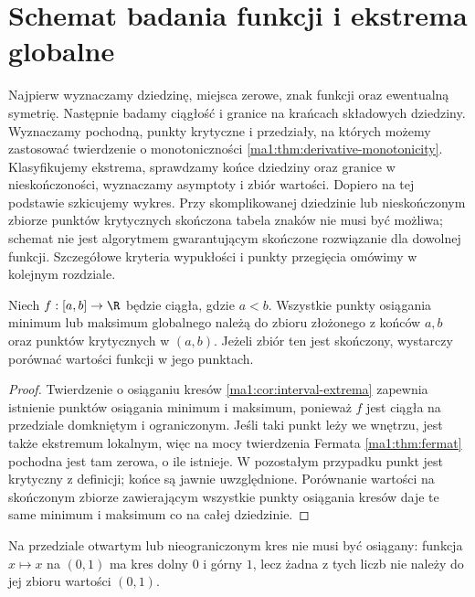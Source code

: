 \section{Schemat badania funkcji i ekstrema globalne}
Najpierw wyznaczamy dziedzinę, miejsca zerowe, znak funkcji oraz ewentualną symetrię. Następnie badamy ciągłość i granice na krańcach składowych dziedziny. Wyznaczamy pochodną, punkty krytyczne i przedziały, na których możemy zastosować twierdzenie o monotoniczności \ref{ma1:thm:derivative-monotonicity}. Klasyfikujemy ekstrema, sprawdzamy końce dziedziny oraz granice w nieskończoności, wyznaczamy asymptoty i zbiór wartości. Dopiero na tej podstawie szkicujemy wykres. Przy skomplikowanej dziedzinie lub nieskończonym zbiorze punktów krytycznych skończona tabela znaków nie musi być możliwa; schemat nie jest algorytmem gwarantującym skończone rozwiązanie dla dowolnej funkcji. Szczegółowe kryteria wypukłości i punkty przegięcia omówimy w kolejnym rozdziale.

\begin{stwierdzenie}
\label{ma1:prop:global-extrema-candidates}
Niech $f:[a,b]\to\R$ będzie ciągła, gdzie $a<b$. Wszystkie punkty osiągania minimum lub maksimum globalnego należą do zbioru złożonego z końców $a,b$ oraz punktów krytycznych w $(a,b)$. Jeżeli zbiór ten jest skończony, wystarczy porównać wartości funkcji w jego punktach.
\end{stwierdzenie}
\begin{proof}
Twierdzenie o osiąganiu kresów \ref{ma1:cor:interval-extrema} zapewnia istnienie punktów osiągania minimum i maksimum, ponieważ $f$ jest ciągła na przedziale domkniętym i ograniczonym. Jeśli taki punkt leży we wnętrzu, jest także ekstremum lokalnym, więc na mocy twierdzenia Fermata \ref{ma1:thm:fermat} pochodna jest tam zerowa, o ile istnieje. W pozostałym przypadku punkt jest krytyczny z definicji; końce są jawnie uwzględnione. Porównanie wartości na skończonym zbiorze zawierającym wszystkie punkty osiągania kresów daje te same minimum i maksimum co na całej dziedzinie.
\end{proof}
Na przedziale otwartym lub nieograniczonym kres nie musi być osiągany: funkcja $x\mapsto x$ na $(0,1)$ ma kres dolny $0$ i górny $1$, lecz żadna z tych liczb nie należy do jej zbioru wartości $(0,1)$.

